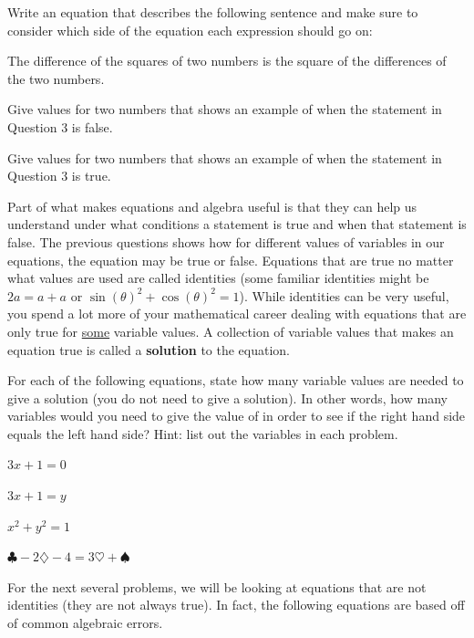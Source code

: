 \bq Write an equation that describes the following sentence and make sure to consider which side of the equation each expression should go on:

The difference of the squares of two numbers is the square of the differences of the two numbers.
\eq

\bq \be
\item Give values for two numbers that shows an example of when the statement in Question 3 is false.
\item Give values for two numbers that shows an example of when the statement in Question 3 is true.
\ee \eq


Part of what makes equations and algebra useful is that they can help us understand under what conditions a statement is true and when that statement is false. The previous questions shows how for different values of variables in our equations, the equation may be true or false. Equations that are true no matter what values are used are called identities (some familiar identities might be $2a=a+a$ or $\sin(\theta)^2 +\cos(\theta)^2=1$). While identities can be very useful, you spend a lot more of your mathematical career dealing with equations that are only true for \underline{some} variable values. A collection of variable values that makes an equation true is called a \textbf{solution} to the equation.

\bq For each of the following equations, state how many variable values are needed to give a solution (you do not need to give a solution). In other words, how many variables would you need to give the value of in order to see if the right hand side equals the left hand side? Hint: list out the variables in each problem.
\be
\item $3x+1=0$
\item $3x+1=y$
\item $x^2+y^2=1$
\item $\clubsuit-2\diamondsuit-4=3\heartsuit+\spadesuit$
\ee
\eq

For the next several problems, we will be looking at equations that are not identities (they are not always true). In fact, the following equations are based off of common algebraic errors.

